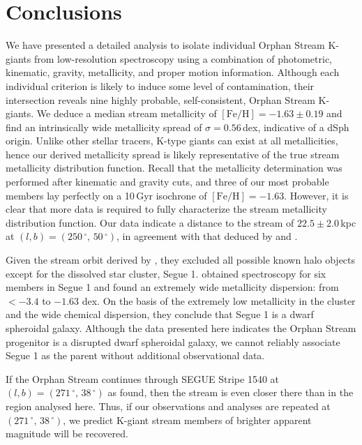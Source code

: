 \documentclass[10pt,apjl]{emulateapj}
\begin{document}
\section{Conclusions}
\label{sec:conclusions}

We have presented a detailed analysis to isolate individual Orphan Stream K-giants from low-resolution spectroscopy using a combination of photometric, kinematic, gravity, metallicity, and proper motion information. Although each individual criterion is likely to induce some level of contamination, their intersection reveals nine highly probable, self-consistent, Orphan Stream K-giants.  We deduce a median stream metallicity of $[\mbox{Fe/H}] = -1.63 \pm 0.19$ and find an intrinsically wide metallicity spread of $\sigma = 0.56$\,dex, indicative of a dSph origin. Unlike other stellar tracers, K-type giants can exist at all metallicities, hence our derived metallicity spread is likely representative of the true stream metallicity distribution function. Recall that the metallicity determination was performed after kinematic and gravity cuts, and three of our most probable members lay perfectly on a 10\,Gyr isochrone of $[\mbox{Fe/H}] = -1.63$. However, it is clear that more data is required to fully characterize the stream metallicity distribution function. Our data indicate a distance to the stream of $22.5 \pm 2.0$\,kpc at $(l, b) = (250\,^\circ,\,50\,^\circ)$, in agreement with that deduced by \citet{Grillmair_2006} and \citet{Newberg_et-al_2010}.

Given the stream orbit derived by \citet{Newberg_et-al_2010}, they excluded all possible known halo objects except for the dissolved star cluster, Segue 1. \citet{Simon_et-al_2011} obtained spectroscopy for six members in Segue 1 and found an extremely wide metallicity dispersion: from $<-3.4$ to $-1.63$ dex. On the basis of the extremely low metallicity in the cluster and the wide chemical dispersion, they conclude that Segue 1 is a dwarf spheroidal galaxy. Although the data presented here indicates the Orphan Stream progenitor is a disrupted dwarf spheroidal galaxy, we cannot reliably associate Segue 1 as the parent without additional observational data. 

If the Orphan Stream continues through SEGUE Stripe 1540 at $(l, b) = (271\,^\circ,\,38\,^\circ)$ as \citet{Newberg_et-al_2010} found, then the stream is even closer there than in the region analysed here. Thus, if our observations and analyses are repeated at $(271\,^\circ,\,38\,^\circ)$, we predict K-giant stream members of brighter apparent magnitude will be recovered. 
\end{document}
